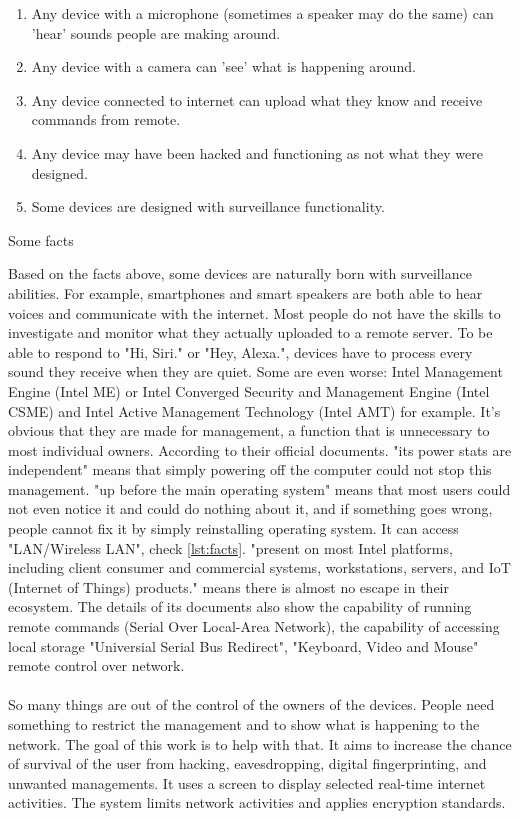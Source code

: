 \documentclass[mscthesis]{usiinfthesis}
\begin{document}
\begin{table}[H]
  \begin{enumerate}
    \item Any device with a microphone (sometimes a speaker may do the same) can 'hear' sounds people are making around.
    \item Any device with a camera can 'see' what is happening around.
    \item Any device connected to internet can upload what they know and receive commands from remote.
    \item Any device may have been hacked and functioning as not what they were designed.
    \item Some devices are designed with surveillance functionality.
  \end{enumerate}
  \caption{Some facts}
  \label{lst:facts}
\end{table}
Based on the facts above, some devices are naturally born with surveillance abilities. For example, smartphones and smart speakers are both able to hear voices and communicate with the internet. Most people do not have the skills to investigate and monitor what they actually uploaded to a remote server. To be able to respond to "Hi, Siri." or "Hey, Alexa.", devices have to process every sound they receive when they are quiet. Some are even worse: Intel Management Engine (Intel ME) or Intel Converged Security and Management Engine (Intel CSME) and Intel Active Management Technology (Intel AMT) for example. It's obvious that they are made for management, a function that is unnecessary to most individual owners. According to their official documents. "its power stats are independent" means that simply powering off the computer could not stop this management. "up before the main operating system" means that most users could not even notice it and could do nothing about it, and if something goes wrong, people cannot fix it by simply reinstalling operating system. It can access "LAN/Wireless LAN", check \cref{lst:facts}. "present on most Intel platforms, including client consumer and commercial systems, workstations, servers, and IoT (Internet of Things) products." means there is almost no escape in their ecosystem. The details of its documents also show the capability of running remote commands (Serial Over Local-Area Network), the capability of accessing local storage "Universial Serial Bus Redirect", "Keyboard, Video and Mouse" remote control over network.
\paragraph{}
So many things are out of the control of the owners of the devices. People need something to restrict the management and to show what is happening to the network. The goal of this work is to help with that. It aims to increase the chance of survival of the user from hacking, eavesdropping, digital fingerprinting, and unwanted managements. It uses a screen to display selected real-time internet activities. The system limits network activities and applies encryption standards.
\end{document}
